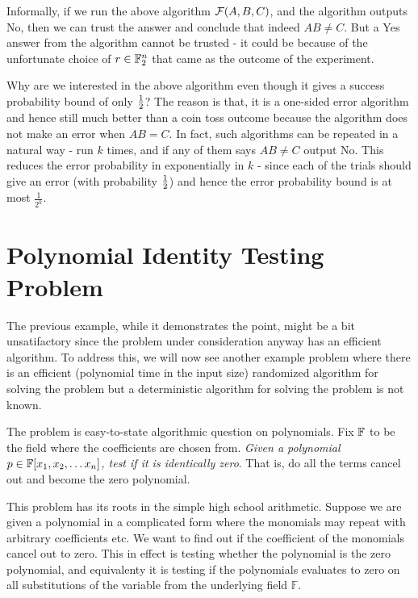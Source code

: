 \begin{remark}
Informally, if we run the above algorithm ${\cal{F}}(A,B,C)$, and the algorithm outputs {\sc No}, then we can trust the answer and conclude that indeed $AB \ne C$. But a {\sc Yes} answer from the algorithm cannot be trusted - it could be because of the unfortunate choice of $r \in {\mathbb{F}}_2^n$ that came as the outcome of the experiment.

Why are we interested in the above algorithm even though it gives a success probability bound of only $\frac{1}{2}$? The reason is that, it is a one-sided error algorithm and hence still much better than a coin toss outcome because the algorithm does not make an error when $AB = C$. In fact, such algorithms can be repeated in a natural way - run $k$ times, and if any of them says $AB \ne C$ output {\sc No}. This reduces the error probability in exponentially in $k$ - since each of the trials should give an error (with probability $\frac{1}{2}$) and hence the error probability bound is at most $\frac{1}{2^k}$.
\end{remark}


\section{Polynomial Identity Testing Problem}

The previous example, while it demonstrates the point, might be a bit unsatifactory since the problem under consideration anyway has an efficient algorithm. To address this, we will now see another example problem where there is an efficient (polynomial time in the input size) randomized algorithm for solving the problem but a deterministic algorithm for solving the problem is not known. 

The problem is easy-to-state algorithmic question on polynomials. Fix ${\mathbb{F}}$ to be the field where the coefficients are chosen from.
{\em Given a polynomial $p \in {\mathbb{F}}[x_1, x_2, \ldots x_n]$, test if it is identically zero}. That is, do all the terms cancel out and become the zero polynomial. 

This problem has its roots in the simple high school
arithmetic. Suppose we are given a polynomial in a complicated form where the monomials may repeat with arbitrary coefficients etc. We want to find out if the coefficient of the monomials cancel out to zero. This in effect is testing whether the polynomial is the zero
polynomial, and equivalenty it is testing if the polynomials evaluates to zero on all substitutions of the variable from the underlying field $\mathbb{F}$.

